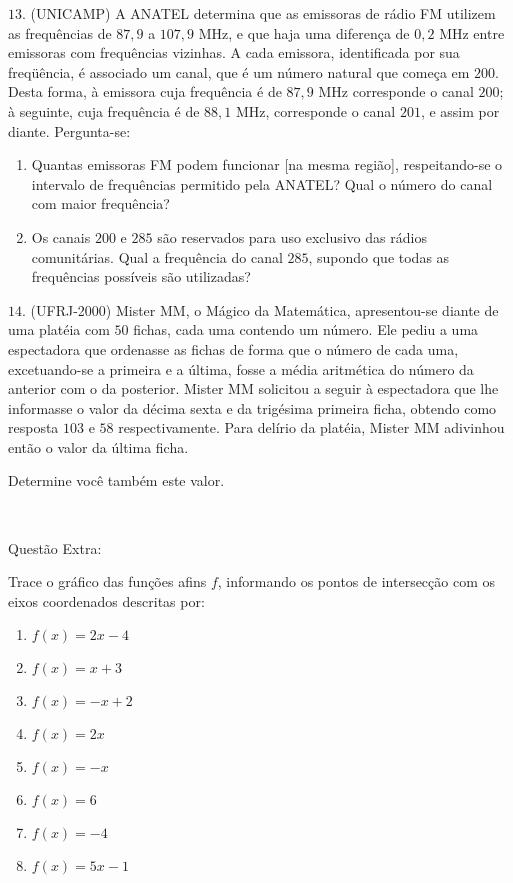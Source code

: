 \(13.\) (UNICAMP) A ANATEL determina que as emissoras de rádio FM utilizem as frequências de \(87,9\) a \(107,9\) MHz, e que haja uma diferença de \(0,2\) MHz entre emissoras com frequências vizinhas. A cada emissora, identificada por sua freqüência, é associado um canal, que é um número natural que começa em \(200\). Desta forma, à emissora cuja frequência é de \(87,9\) MHz corresponde o canal \(200\); à seguinte, cuja frequência é de \(88,1\) MHz, corresponde o
canal \(201\), e assim por diante. Pergunta-se:
\begin{enumerate}
\item {} 
Quantas emissoras FM podem funcionar {[}na mesma região{]}, respeitando-se o intervalo de frequências permitido pela ANATEL? Qual o número do canal com maior frequência?

\item {} 
Os canais \(200\) e \(285\) são reservados para uso exclusivo das rádios comunitárias. Qual a frequência do canal \(285\), supondo que todas as frequências possíveis são utilizadas?

\end{enumerate}

\(14.\) (UFRJ-2000) Mister MM, o Mágico da Matemática, apresentou-se diante de uma platéia com \(50\) fichas, cada uma contendo um número. Ele pediu a uma espectadora que ordenasse as fichas de forma que o número de cada uma, excetuando-se a primeira e a última, fosse a média aritmética do número da anterior com o da posterior. Mister MM solicitou a seguir à espectadora que lhe informasse o valor da décima sexta e da trigésima primeira ficha, obtendo como resposta \(103\) e \(58\) respectivamente. Para delírio da platéia, Mister MM adivinhou então o valor da última ficha.

Determine você também este valor.

\

Questão Extra:

Trace o gráfico das funções afins \(f\), informando os pontos de intersecção com os eixos coordenados descritas por:
\begin{enumerate}
\item {} 
\(f(x)=2x-4\)

\item {} 
\(f(x)=x+3\)

\item {} 
\(f(x)=-x+2\)

\item {} 
\(f(x)=2x\)

\item {} 
\(f(x)=-x\)

\item {} 
\(f(x)=6\)

\item {} 
\(f(x)=-4\)

\item {} 
\(f(x)=5x-1\)

\end{enumerate}


